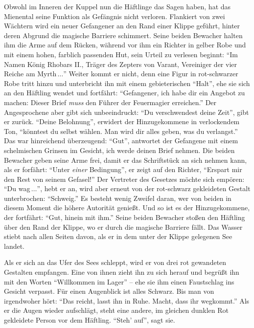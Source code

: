 \documentclass[a5paper,pagesize,numbers=noenddot]{scrbook}
\begin{document}
Obwohl im Inneren der Kuppel nun die Häftlinge das Sagen haben, hat das Mienental seine Funktion als Gefängnis nicht verloren.
Flankiert von zwei Wächtern wird ein neuer Gefangener an den Rand einer Klippe geführt, hinter deren Abgrund die magische Barriere schimmert.
Seine beiden Bewacher halten ihm die Arme auf dem Rücken, während vor ihm ein Richter in gelber Robe und mit einem hohen, farblich passenden Hut, sein Urteil zu verlesen beginnt:
\enquote{Im Namen König Rhobars II., Träger des Zepters von Varant, Vereiniger der vier Reiche am Myrth\,$\ldots$}
Weiter kommt er nicht, denn eine Figur in rot-schwarzer Robe tritt hinzu und unterbricht ihn mit einem gebieterischen \enquote{Halt}, ehe sie sich an den Häftling wendet und fortfährt:
\enquote{Gefangener, ich habe dir ein Angebot zu machen:
Dieser Brief \textit{muss} den Führer der Feuermagier erreichen.}
Der Angesprochene aber gibt sich unbeeindruckt:
\enquote{Du verschwendest deine Zeit}, gibt er zurück.
\enquote{Deine Belohnung}, erwidert der Hinzugekommene in verlockendem Ton, \enquote{könntest du selbst wählen.
Man wird dir alles geben, was du verlangst.}
Das war hinreichend überzeugend:
\enquote{Gut}, antwortet der Gefangene mit einem schelmischen Grinsen im Gesicht, {ich werde deinen Brief nehmen.}
Die beiden Bewacher geben seine Arme frei, damit er das Schriftstück an sich nehmen kann, als er forfährt:
\enquote{Unter \textit{einer} Bedingung}, er zeigt auf den Richter, \enquote{Erspart mir den Rest von seinem Gefasel!}
Der Vertreter des Gesetzes möchte sich empören:
\enquote{Du wag\,$\ldots$}, hebt er an, wird aber erneut von der rot-schwarz gekleideten Gestalt unterbrochen:
\enquote{Schweig.}
Es besteht wenig Zweifel daran, wer von beiden in diesem Moment die höhere Autorität genießt.
Und so ist es der Hinzugekommene, der fortfährt:
\enquote{Gut, hinein mit ihm.}
Seine beiden Bewacher stoßen den Häftling über den Rand der Klippe, wo er durch die magische Barriere fällt. 
Das Wasser stiebt nach allen Seiten davon, als er in dem unter der Klippe gelegenen See landet.

Als er sich an das Ufer des Sees schleppt, wird er von drei rot gewandeten Gestalten empfangen.
Eine von ihnen zieht ihn zu sich herauf und begrüßt ihn mit den Worten \enquote{Willkommen im Lager} -- ehe sie ihm einen Faustschlag ins Gesicht verpasst.
Für einen Augenblick ist alles Schwarz.
Bis man von irgendwoher hört:
\enquote{Das reicht, lasst ihn in Ruhe.
Macht, dass ihr wegkommt.}
Als er die Augen wieder aufschlägt, steht eine andere, im gleichen dunklen Rot gekleidete Person vor dem Häftling.
\enquote{Steh' auf}, sagt sie.
\end{document}
